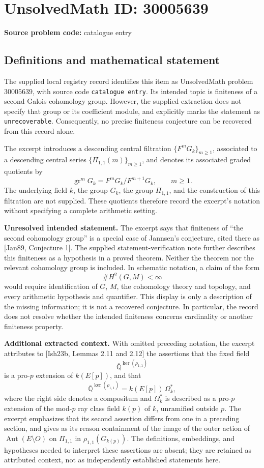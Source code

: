 \documentclass[11pt]{article}
\newcommand{\Q}{\mathbb{Q}}
\begin{document}
\section*{UnsolvedMath ID: 30005639}
\textbf{Source problem code:} catalogue entry
\subsection{Definitions and mathematical statement}
The supplied local registry record identifies this item as UnsolvedMath problem \(30005639\), with source code \texttt{catalogue entry}. Its intended topic is finiteness of a second Galois cohomology group. However, the supplied extraction does not specify that group or its coefficient module, and explicitly marks the statement as \texttt{unrecoverable}. Consequently, no precise finiteness conjecture can be recovered from this record alone.

The excerpt introduces a descending central filtration \(\{F^mG_k\}_{m\geq 1}\), associated to a descending central series \(\{\Pi_{1,1}(m)\}_{m\geq 1}\), and denotes its associated graded quotients by
\[
\operatorname{gr}^mG_k=F^mG_k/F^{m+1}G_k,\qquad m\geq 1.
\]
The underlying field \(k\), the group \(G_k\), the group \(\Pi_{1,1}\), and the construction of this filtration are not supplied. These quotients therefore record the excerpt's notation without specifying a complete arithmetic setting.

\textbf{Unresolved intended statement.} The excerpt says that finiteness of ``the second cohomology group'' is a special case of Jannsen's conjecture, cited there as [Jan89, Conjecture 1]. The supplied statement-verification note further describes this finiteness as a hypothesis in a proved theorem. Neither the theorem nor the relevant cohomology group is included. In schematic notation, a claim of the form
\[
\#H^2(G,M)<\infty
\]
would require identification of \(G\), \(M\), the cohomology theory and topology, and every arithmetic hypothesis and quantifier. This display is only a description of the missing information; it is not a recovered conjecture. In particular, the record does not resolve whether the intended finiteness concerns cardinality or another finiteness property.

\textbf{Additional extracted context.} With omitted preceding notation, the excerpt attributes to [Ish23b, Lemmas 2.11 and 2.12] the assertions that the fixed field
\[
\overline{\Q}^{\ker(\rho_{1,1})}
\]
is a pro-\(p\) extension of \(k(E[p])\), and that
\[
\overline{\Q}^{\ker(\rho_{1,1})}=k(E[p])\,\Omega_k^*,
\]
where the right side denotes a compositum and \(\Omega_k^*\) is described as a pro-\(p\) extension of the mod-\(p\) ray class field \(k(p)\) of \(k\), unramified outside \(p\). The excerpt emphasizes that its second assertion differs from one in a preceding section, and gives as its reason containment of the image of the outer action of \(\operatorname{Aut}(E\setminus O)\) on \(\Pi_{1,1}\) in \(\rho_{1,1}(G_{k(p)})\). The definitions, embeddings, and hypotheses needed to interpret these assertions are absent; they are retained as attributed context, not as independently established statements here.
\end{document}

